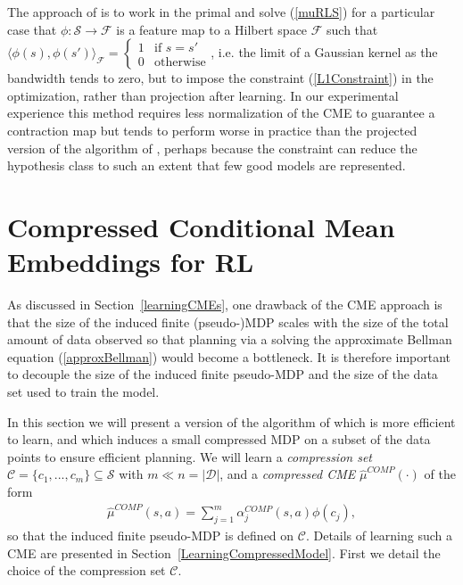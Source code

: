 \documentclass[letterpaper]{article}
\newcommand{\CsabaFLAM}{DBLP:conf/adprl/YaoSPZ14}
\newcommand{\GrunewalderEmbeddingsRL}{GrunewalderEmbeddingsMDP}
\newcommand{\cD}{{\mathcal D}}
\newcommand{\cC}{{\mathcal C}}
\newcommand{\cF}{{\mathcal F}}
\newcommand{\cS}{{\mathcal S}}
\newcommand{\lang}{\langle}
\newcommand{\rang}{\rangle}
\begin{document}
The approach of \cite{\CsabaFLAM} is to work in the primal and solve (\ref{muRLS}) for a particular case that $\phi:\cS\to\cF$ is a feature map to a Hilbert space $\cF$ such that $\lang\phi(s),\phi(s')\rang_{\cF} = \left\{ \begin{array}{ll} 1 & \mbox{if } s=s' \\ 0 & \mbox{otherwise} \end{array}\right.$, i.e. the limit of a Gaussian kernel as the bandwidth tends to zero, but to impose the constraint (\ref{L1Constraint}) in the optimization, rather than projection after learning. In our experimental experience this method requires less normalization of the CME to guarantee a contraction map but tends to perform worse in practice than the projected version of the algorithm of \cite{\GrunewalderEmbeddingsRL}, perhaps because the constraint can reduce the hypothesis class to such an extent that few good models are represented.

\section{Compressed Conditional Mean Embeddings for RL}  \label{Compression}

As discussed in Section~\ref{learningCMEs}, one drawback of the CME approach is that the size of the induced finite (pseudo-)MDP scales with the size of the total amount of data observed so that planning via a solving the approximate Bellman equation (\ref{approxBellman}) would become a bottleneck. It is therefore important to decouple the size of the induced finite pseudo-MDP and the size of the data set used to train the model.

In this section we will present a version of the algorithm of \cite{\GrunewalderEmbeddingsRL} which is more efficient to learn, and which induces a small compressed MDP on a subset of the data points to ensure efficient planning. We will learn a \emph{compression set} $\cC = \{ c_1,...,c_m \}\subseteq \cS$  with $m\ll n = |\cD|$, and a \emph{compressed CME} $\hat\mu^{COMP}(\cdot)$ of the form
\begin{align}
\hat\mu^{COMP}(s,a) = \sum_{j=1}^m \alpha^{COMP}_j(s,a) \phi(c_j), \label{CompressedCME}
\end{align}
so that the induced finite pseudo-MDP is defined on $\cC$. Details of learning such a CME are presented in Section~\ref{LearningCompressedModel}. First we detail the choice of the compression set $\cC$.
\end{document}
